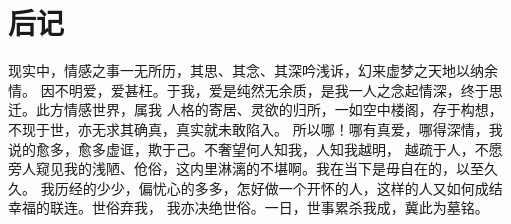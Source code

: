 \part{后记}

\vspace*{2\ccwd}

\hspace*{2em}现实中，情感之事一无所历，其思、其念、其深吟浅诉，幻来虚梦之天地以纳余情。
因不明爱，爱甚枉。于我，爱是纯然无余质，是我一人之念起情深，终于思迁。此方情感世界，属我
人格的寄居、灵欲的归所，一如空中楼阁，存于构想，不现于世，亦无求其确真，真实就未敢陷入。
所以哪！哪有真爱，哪得深情，我说的愈多，愈多虚诓，欺于己。不奢望何人知我，人知我越明，
越疏于人，不愿旁人窥见我的浅陋、伧俗，这内里淋漓的不堪啊。我在当下是毋自在的，以至久久。
我历经的少少，偏忧心的多多，怎好做一个开怀的人，这样的人又如何成结幸福的联连。世俗弃我，
我亦决绝世俗。一日，世事累杀我成，冀此为墓铭。

\newpage